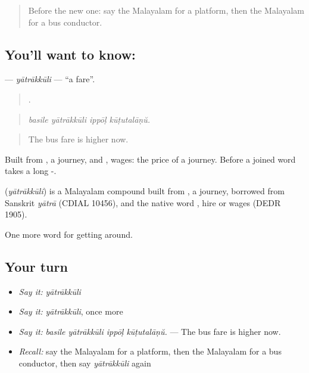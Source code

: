 \label{lesson:ML-C461-yatrakkuli}



\begin{quote}
Before the new one: say the Malayalam for a platform, then the Malayalam for a bus conductor.
\end{quote}

\subsection*{You'll want to know: }
\textbf{} — \emph{yātrākkūli} — \textquotedblleft{}a fare\textquotedblright{}.

\begin{quote}
   .
\end{quote}

\begin{quote}
\emph{basile yātrākkūli ippōḷ kūṭutalāṇŭ.}
\end{quote}

\begin{quote}
The bus fare is higher now.
\end{quote}

Built from , a journey, and , wages: the price of a journey. Before a joined word  takes a long -.

\begin{cousinweb}
\textbf{} (\emph{yātrākkūli}) is a Malayalam compound built from , a journey, borrowed from Sanskrit \emph{yātrā} (CDIAL 10456), and the native word , hire or wages (DEDR 1905).
\end{cousinweb}

\begin{grammarlens}[title={What you've built}]
One more word for getting around.
\end{grammarlens}

\subsection*{Your turn}
\begin{itemize}
\raggedright
  \item \emph{Say it:} \emph{yātrākkūli}
  \item \emph{Say it:} \emph{yātrākkūli}, once more
  \item \emph{Say it:} \emph{basile yātrākkūli ippōḷ kūṭutalāṇŭ.} — The bus fare is higher now.
  \item \emph{Recall:} say the Malayalam for a platform, then the Malayalam for a bus conductor, then say \emph{yātrākkūli} again
\end{itemize}


